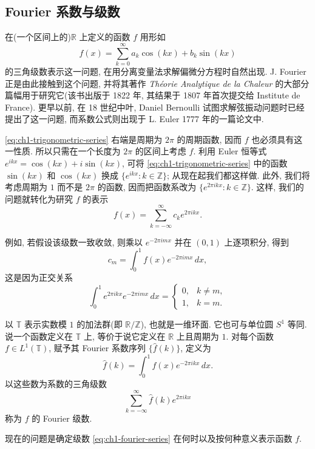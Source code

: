 \hypertarget{chapter-01-page-013}{}
\subsection{Fourier 系数与级数}
\label{sec:ch1-fourier-coefficients-series}

在(一个区间上的)$\mathbb R$ 上定义的函数 $f$ 用形如
\begin{equation}
\label{eq:ch1-trigonometric-series}
 f(x)=\sum_{k=0}^{\infty}a_k\cos(kx)+b_k\sin(kx)
\end{equation}
的三角级数表示这一问题, 在用分离变量法求解偏微分方程时自然出现. J. Fourier 正是由此接触到这个问题, 并将其著作 \emph{Th\'eorie Analytique de la Chaleur} 的大部分篇幅用于研究它(该书出版于 1822 年, 其结果于 1807 年首次提交给 Institute de France). 更早以前, 在 18 世纪中叶, Daniel Bernoulli 试图求解弦振动问题时已经提出了这一问题, 而系数公式则出现于 L. Euler 1777 年的一篇论文中.

\eqref{eq:ch1-trigonometric-series} 右端是周期为 $2\pi$ 的周期函数, 因而 $f$ 也必须具有这一性质. 所以只需在一个长度为 $2\pi$ 的区间上考虑 $f$. 利用 Euler 恒等式 $e^{ikx}=\cos(kx)+i\sin(kx)$, 可将 \eqref{eq:ch1-trigonometric-series} 中的函数 $\sin(kx)$ 和 $\cos(kx)$ 换成 $\{e^{ikx}:k\in\mathbb Z\}$; 从现在起我们都这样做. 此外, 我们将考虑周期为 $1$ 而不是 $2\pi$ 的函数, 因而把函数系改为 $\{e^{2\pi ikx}:k\in\mathbb Z\}$. 这样, 我们的问题就转化为研究 $f$ 的表示
\begin{equation}
\label{eq:ch1-complex-fourier-series}
 f(x)=\sum_{k=-\infty}^{\infty}c_ke^{2\pi ikx}.
\end{equation}

\hypertarget{chapter-01-page-014}{}
例如, 若假设该级数一致收敛, 则乘以 $e^{-2\pi imx}$ 并在 $(0,1)$ 上逐项积分, 得到
\[
 c_m=\int_0^1f(x)e^{-2\pi imx}\,dx,
\]
这是因为正交关系
\begin{equation}
\label{eq:ch1-exponential-orthogonality}
 \int_0^1e^{2\pi ikx}e^{-2\pi imx}\,dx=
 \begin{cases}
 0,&k\ne m,\\
 1,&k=m.
 \end{cases}
\end{equation}

以 $\mathbb T$ 表示实数模 $1$ 的加法群(即 $\mathbb R/\mathbb Z$), 也就是一维环面. 它也可与单位圆 $S^1$ 等同. 说一个函数定义在 $\mathbb T$ 上, 等价于说它定义在 $\mathbb R$ 上且周期为 $1$. 对每个函数 $f\in L^1(\mathbb T)$, 赋予其 Fourier 系数序列 $\{\widehat f(k)\}$, 定义为
\begin{equation}
\label{eq:ch1-fourier-coefficient}
 \widehat f(k)=\int_0^1f(x)e^{-2\pi ikx}\,dx.
\end{equation}
以这些数为系数的三角级数
\begin{equation}
\label{eq:ch1-fourier-series}
 \sum_{k=-\infty}^{\infty}\widehat f(k)e^{2\pi ikx}
\end{equation}
称为 $f$ 的 Fourier 级数.

现在的问题是确定级数 \eqref{eq:ch1-fourier-series} 在何时以及按何种意义表示函数 $f$.

